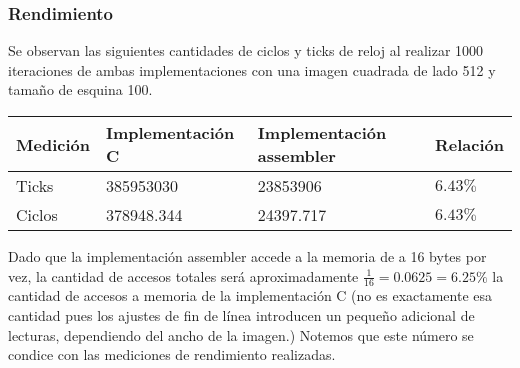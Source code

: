 \subsubsection{Rendimiento}

Se observan las siguientes cantidades de ciclos y ticks de reloj al realizar 1000 iteraciones de ambas implementaciones con una imagen cuadrada de lado 512 y tamaño de esquina 100.

\begin{center}
    \begin{tabular}{|l|l|l|l|}
        \hline
        Medición & Implementación C & Implementación assembler & Relación \\
        \hline
        Ticks    & 385953030        & 23853906                 & $6.43\%$ \\
        Ciclos   & 378948.344       & 24397.717                & $6.43\%$ \\
        \hline
    \end{tabular}
\end{center}

Dado que la implementación assembler accede a la memoria de a 16 bytes por vez, la cantidad de
accesos totales será aproximadamente $\frac{1}{16} = 0.0625 = 6.25\%$ la cantidad de
accesos a memoria de la implementación C (no es exactamente esa cantidad pues los ajustes de
fin de línea introducen un pequeño adicional de lecturas, dependiendo del ancho de la imagen.)
Notemos que este número se condice con las mediciones de rendimiento realizadas.